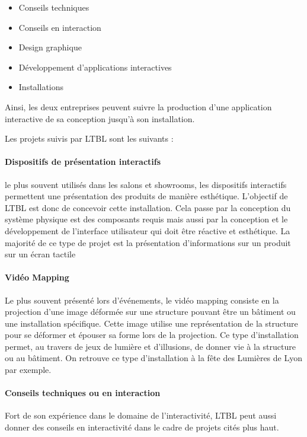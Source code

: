 \begin{itemize}
    \item Conseils techniques
    \item Conseils en interaction
    \item Design graphique
    \item Développement d'applications interactives
    \item Installations
\end{itemize}

Ainsi, les deux entreprises peuvent suivre la production d'une application interactive de sa conception jusqu'à son installation.

\medskip

Les projets suivis par LTBL sont les suivants :

\paragraph{Dispositifs de présentation interactifs} le plus souvent utilisés dans les salons et showrooms, les dispositifs interactifs permettent une présentation des produits de manière esthétique.
L'objectif de LTBL est donc de concevoir cette installation.
Cela passe par la conception du système physique est des composants requis mais aussi par la conception et le développement de l'interface utilisateur qui doit être réactive et esthétique.
La majorité de ce type de projet est la présentation d'informations sur un produit sur un écran tactile

\paragraph{Vidéo Mapping} Le plus souvent présenté lors d'événements, le vidéo mapping consiste en la projection d'une image déformée sur une structure pouvant être un bâtiment ou une installation spécifique.
Cette image utilise une représentation de la structure pour se déformer et épouser sa forme lors de la projection.
Ce type d'installation permet, au travers de jeux de lumière et d'illusions, de donner vie à la structure ou au bâtiment.
On retrouve ce type d'installation à la fête des Lumières de Lyon par exemple.

\paragraph{Conseils techniques ou en interaction} Fort de son expérience dans le domaine de l'interactivité, LTBL peut aussi donner des conseils en interactivité dans le cadre de projets cités plus haut.

